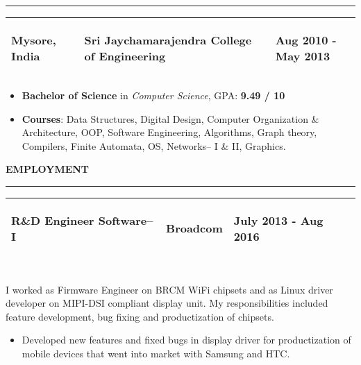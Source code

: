 \documentclass[a4paper, 10pt]{extarticle}
\begin{document}
\begin{large}
\hrule
\vspace{.1cm}
{\begin{tabular}{ p{3cm} p{10cm} p{4.4cm} }
    \textbf{Mysore, India} & \vspace{-.6cm} \begin{center}\textbf{{Sri Jaychamarajendra College of Engineering}} \end{center} \vspace{-0.8cm} &
    \vspace{-0.6cm}
    \begin{flushright}
    \textbf{Aug 2010 - May 2013} 
    \end{flushright}
    \vspace{-0.7cm} \\
    \hline
\end{tabular}}
\begin{itemize}
    \setlength\itemsep{-0.05 cm}
    \item {\textbf{Bachelor of Science} in \textit{Computer Science}, GPA: \textbf{9.49 / 10}}
    \item{\textbf{Courses}: Data Structures, Digital Design,  Computer Organization \& Architecture, OOP, Software Engineering, Algorithms, Graph theory, Compilers, Finite Automata, OS, Networks-- I \& II, Graphics.}
\end{itemize}
\vspace{.2cm}
{\LARGE{\textbf{E}}\Large{\textbf{MPLOYMENT}}}
\vspace{.1cm} \hrule \vspace{.1cm}
{\begin{tabular}{ p{6cm} p{5cm} p{6.5cm} }
    \textbf{R\&D Engineer Software--I} & \vspace{-.6cm} \begin{center}\textbf{{Broadcom}} \end{center} \vspace{-0.8cm} & 
    \vspace{-0.7cm} 
    \begin{flushright} \textbf{July 2013 - Aug 2016} \end{flushright} 
    \vspace{-0.8cm}\\
    \hline
\end{tabular}}
\vspace{0.3cm} \\
I worked as Firmware Engineer on BRCM WiFi chipsets and as Linux driver developer on MIPI-DSI compliant display unit. My responsibilities included feature development, bug fixing and productization  of chipsets.
\begin{itemize}
    \setlength\itemsep{-0.05 cm}
    \item{Developed new features and fixed bugs in display driver for productization of  mobile devices that went into market with Samsung and HTC.}
    

\end{itemize}
\end{large}
\end{document}
